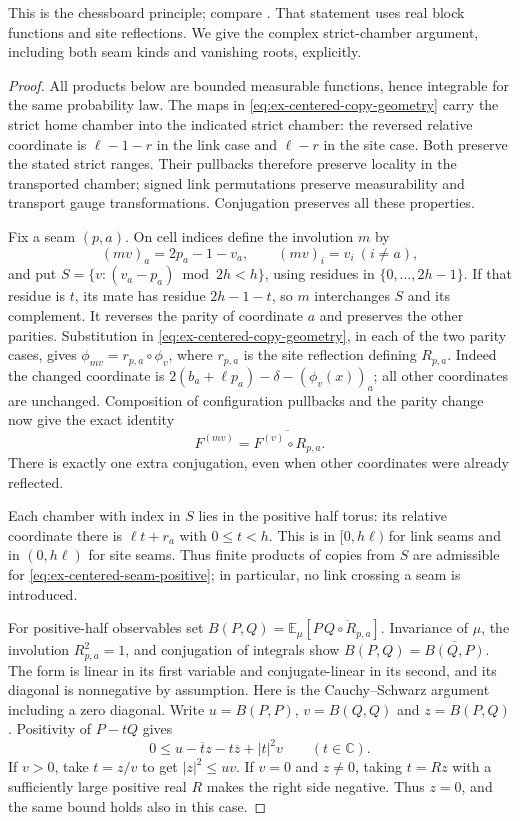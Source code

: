 This is the chessboard principle; compare \cite[\S5.3, Theorem~5.8]{Biskup09}.
That statement uses real block functions and site reflections. We give
the complex strict-chamber argument, including both seam kinds and
vanishing roots, explicitly.

\begin{proof}
All products below are bounded measurable functions, hence integrable
for the same probability law. The maps in
\eqref{eq:ex-centered-copy-geometry} carry the strict home chamber into
the indicated strict chamber: the reversed relative coordinate is
$\ell-1-r$ in the link case and $\ell-r$ in the site case.
Both preserve the stated strict ranges. Their pullbacks therefore
preserve locality in the transported chamber; signed link permutations
preserve measurability and transport gauge transformations. Conjugation
preserves all these properties.

Fix a seam $(p,a)$. On cell indices define the involution $m$ by
\[
 (mv)_a=2p_a-1-v_a,\qquad (mv)_i=v_i\ (i\ne a),
\]
and put $S=\{v:(v_a-p_a)\bmod 2h<h\}$, using residues in
$\{0,\ldots,2h-1\}$. If that residue is $t$, its mate has residue
$2h-1-t$, so $m$ interchanges $S$ and its complement. It reverses
the parity of coordinate $a$ and preserves the other parities.
Substitution in \eqref{eq:ex-centered-copy-geometry}, in each of the
two parity cases, gives
$\phi_{mv}=r_{p,a}\circ\phi_v$, where $r_{p,a}$ is the site
reflection defining $R_{p,a}$. Indeed the changed coordinate is
$2(b_a+\ell p_a)-\delta-(\phi_v(x))_a$; all other coordinates
are unchanged. Composition of configuration pullbacks and the parity
change now give the exact identity
\begin{equation}\label{eq:ex-centered-copy-opposite}
             F^{(mv)}=\overline{F^{(v)}\circ R_{p,a}}.
\end{equation}
There is exactly one extra conjugation, even when other coordinates
were already reflected.

Each chamber with index in $S$ lies in the positive half torus:
its relative coordinate there is $\ell t+r_a$ with $0\le t<h$.
This is in $[0,h\ell)$ for link seams and in $(0,h\ell)$ for
site seams. Thus finite products of copies from $S$ are admissible
for \eqref{eq:ex-centered-seam-positive}; in particular, no link
crossing a seam is introduced.

For positive-half observables set
$B(P,Q)=\mathbb E_\mu[P\,\overline{Q\circ R_{p,a}}]$.
Invariance of $\mu$, the involution $R_{p,a}^2=1$, and conjugation
of integrals show $B(P,Q)=\overline{B(Q,P)}$. The form is linear
in its first variable and conjugate-linear in its second, and its
diagonal is nonnegative by assumption. Here is the Cauchy--Schwarz
argument including a zero diagonal. Write $u=B(P,P)$, $v=B(Q,Q)$
and $z=B(P,Q)$. Positivity of $P-tQ$ gives
\[
 0\le u-\overline t z-t\overline z+|t|^2v\qquad(t\in\mathbb C).
\]
If $v>0$, take $t=z/v$ to get $|z|^2\le uv$. If $v=0$
and $z\ne0$, taking $t=Rz$ with a sufficiently large positive real
$R$ makes the right side negative. Thus $z=0$, and the same bound
holds also in this case.


\end{proof}
